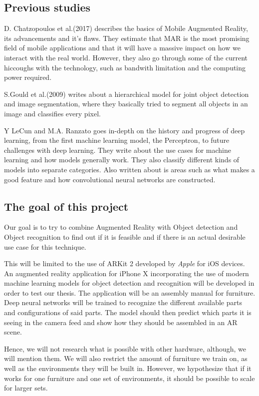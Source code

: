 \subsection{Previous studies}
\label{subsecPrevStud}
D. Chatzopoulos et al.(2017) describes the basics of Mobile Augmented Reality, its advancements and it's flaws. They estimate that MAR is the most promising field of mobile applications and that it will have a massive impact on how we interact with the real world. However, they also go through some of the current hiccoughs with the technology, such as bandwith limitation and the computing power required. 
\cite{MARS}

S.Gould et al.(2009) writes about a hierarchical model for joint object detection and image segmentation, where they basically tried to segment all objects in an image and classifies every pixel. 
\cite{NIPS2009_3766}


Y LeCun and M.A. Ranzato goes in-depth on the history and progress of deep learning, from the first machine learning model, the Perceptron, to future challenges with deep learning. They write about the use cases for machine learning and how models generally work. They also classify different kinds of models into separate categories. Also written about is areas such as what makes a good feature and how convolutional neural networks are constructed.
\cite{deepLearningTutorial}


\subsection{The goal of this project}
\label{subsecGoal}
Our goal is to try to combine Augmented Reality with Object detection and Object recognition to find out if it is feasible and if there is an actual desirable use case for this technique. 

This will be limited to the use of ARKit 2 developed by \textit{Apple} for iOS devices. An augmented reality application for iPhone X incorporating the use of modern machine learning models for object detection and recognition will be developed in order to test our thesis. The application will be an assembly manual for furniture. Deep neural networks will be trained to recognize the different available parts and configurations of said parts.  The model should then predict which parts it is seeing in the camera feed and show how they should be assembled in an AR scene. 

Hence, we will not research what is possible with other hardware, although, we will mention them. We will also restrict the amount of furniture we train on, as well as the environments they will be built in. However, we hypothesize that if it works for one furniture and one set of environments, it should be possible to scale for larger sets.



